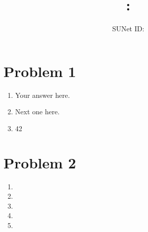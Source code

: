 \documentclass{article}
\title{\coursename : \exerciseset}
\author{\studentname \qquad SUNet ID: \suid}
\theoremstyle{plain}
\begin{document}
\maketitle

\section*{Problem 1}
\begin{enumerate}
\item %
Your answer here.

\item %
Next one here.

\item %
42

\end{enumerate}

\section*{Problem 2}
\begin{enumerate}
\item %

\item %

\item %

\item %

\item %

\end{enumerate}
\end{document}
